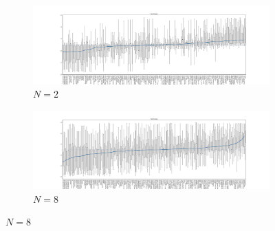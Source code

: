 \documentclass{article}
\begin{document}
\begin{figure}[!hbtp]
    \centering
    \begin{subfigure}[t]{\textwidth}
        \centering
        \includegraphics[width=\textwidth]{../img/fixation_boxplot_2_noise.pdf}
        \caption{\(N=2\)}
    \end{subfigure}%



    \begin{subfigure}[t]{\textwidth}
        \centering
        \includegraphics[width=\textwidth]{../img/fixation_boxplot_8_noise.pdf}
        \caption{\(N=8\)}
    \end{subfigure}%




\end{figure}
\end{document}
